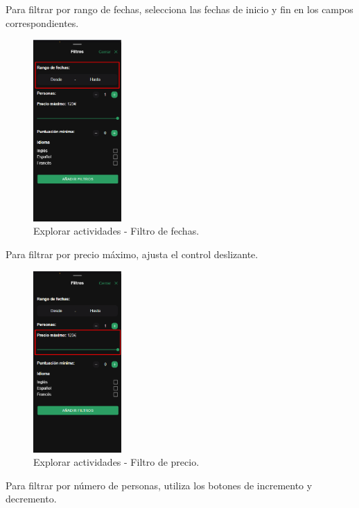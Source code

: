 Para filtrar por rango de fechas, selecciona las fechas de inicio y fin en los campos correspondientes.
\begin{figure}[H]
	\centering
	\includegraphics[width=0.3\textwidth]{7-Construccion/Manuales/mobile/filtro fechas.png}
	\caption{Explorar actividades - Filtro de fechas.}
\end{figure}
Para filtrar por precio máximo, ajusta el control deslizante.
\begin{figure}[H]
	\centering
	\includegraphics[width=0.3\textwidth]{7-Construccion/Manuales/mobile/filtro precio.png}
	\caption{Explorar actividades - Filtro de precio.}
\end{figure}
Para filtrar por número de personas, utiliza los botones de incremento y decremento.

